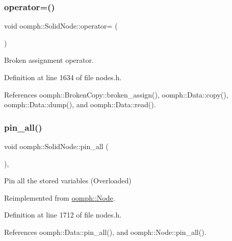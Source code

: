 \subsubsection{\texorpdfstring{operator=()}{operator=()}}
{\footnotesize\ttfamily void oomph\+::\+Solid\+Node\+::operator= (\begin{DoxyParamCaption}\item[{const \hyperlink{classoomph_1_1SolidNode}{Solid\+Node} \&}]{ }\end{DoxyParamCaption})\hspace{0.3cm}{\ttfamily [inline]}}



Broken assignment operator. 



Definition at line 1634 of file nodes.\+h.



References oomph\+::\+Broken\+Copy\+::broken\+\_\+assign(), oomph\+::\+Data\+::copy(), oomph\+::\+Data\+::dump(), and oomph\+::\+Data\+::read().

\mbox{\label{classoomph_1_1SolidNode_ab051ba65aed07fe75f6cfd9b32de62cc}} 
\subsubsection{\texorpdfstring{pin\+\_\+all()}{pin\_all()}}
{\footnotesize\ttfamily void oomph\+::\+Solid\+Node\+::pin\+\_\+all (\begin{DoxyParamCaption}{ }\end{DoxyParamCaption})\hspace{0.3cm}{\ttfamily [inline]}, {\ttfamily [virtual]}}



Pin all the stored variables (Overloaded) 



Reimplemented from \hyperlink{classoomph_1_1Node_a3f0d0e77ba866ce8ad3c5c012b647080}{oomph\+::\+Node}.



Definition at line 1712 of file nodes.\+h.



References oomph\+::\+Data\+::pin\+\_\+all(), and oomph\+::\+Node\+::pin\+\_\+all().

\mbox{\label{classoomph_1_1SolidNode_aa283a553b0141e859dd7b4f80bb88e6d}} 
